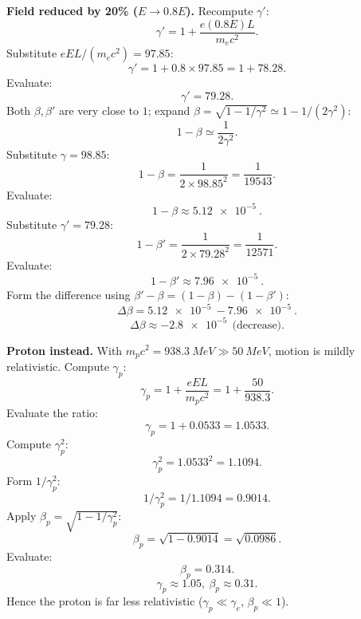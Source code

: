 \documentclass[11pt]{article}
\begin{document}
\begin{center}
\end{center}

\noindent\textbf{Field reduced by 20\% ($E\to 0.8E$).} Recompute $\gamma'$:
\[ \gamma' = 1 + \frac{e(0.8E)L}{m_ec^2}. \]
Substitute $eEL/(m_ec^2) = 97.85$:
\[ \gamma' = 1 + 0.8\times 97.85 = 1 + 78.28. \]
Evaluate:
\[ \gamma' = 79.28. \]
Both $\beta,\beta'$ are very close to $1$; expand $\beta = \sqrt{1-1/\gamma^2}\simeq 1 - 1/(2\gamma^2)$:
\[ 1-\beta \simeq \frac{1}{2\gamma^2}. \]
Substitute $\gamma=98.85$:
\[ 1-\beta = \frac{1}{2\times 98.85^2} = \frac{1}{19543}. \]
Evaluate:
\[ 1-\beta \approx \SI{5.12e-5}{}. \]
Substitute $\gamma'=79.28$:
\[ 1-\beta' = \frac{1}{2\times 79.28^2} = \frac{1}{12571}. \]
Evaluate:
\[ 1-\beta' \approx \SI{7.96e-5}{}. \]
Form the difference using $\beta'-\beta = (1-\beta) - (1-\beta')$:
\[ \Delta\beta = \SI{5.12e-5}{}-\SI{7.96e-5}{}. \]
\[ \boxed{\;\Delta\beta \approx -\SI{2.8e-5}{}\ \text{(decrease)}.\;} \]

\noindent\textbf{Proton instead.} With $m_p c^2 = \SI{938.3}{MeV}\gg \SI{50}{MeV}$, motion is mildly relativistic. Compute $\gamma_p$:
\[ \gamma_p = 1 + \frac{eEL}{m_p c^2} = 1 + \frac{50}{938.3}. \]
Evaluate the ratio:
\[ \gamma_p = 1 + 0.0533 = 1.0533. \]
Compute $\gamma_p^2$:
\[ \gamma_p^2 = 1.0533^2 = 1.1094. \]
Form $1/\gamma_p^2$:
\[ 1/\gamma_p^2 = 1/1.1094 = 0.9014. \]
Apply $\beta_p = \sqrt{1-1/\gamma_p^2}$:
\[ \beta_p = \sqrt{1-0.9014} = \sqrt{0.0986}. \]
Evaluate:
\[ \beta_p = 0.314. \]
\[ \boxed{\;\gamma_p\approx 1.05,\ \beta_p\approx 0.31.\;} \]
Hence the proton is far less relativistic ($\gamma_p\ll\gamma_e$, $\beta_p\ll 1$).

\end{document}
